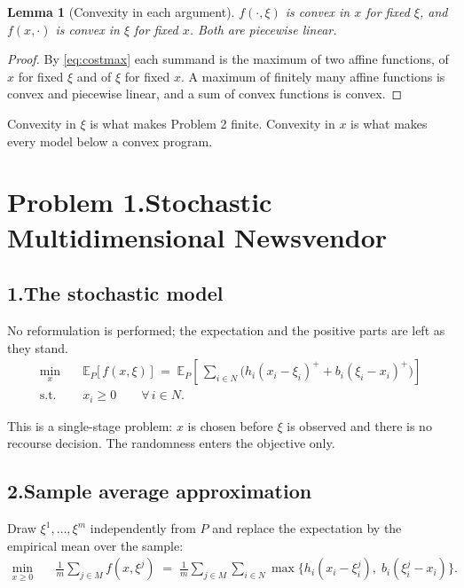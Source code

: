 \documentclass[11pt]{article}
\DeclareMathOperator*{\minimize}{min}
\newtheorem{lemma}{Lemma}
\theoremstyle{definition}
\begin{document}
\begin{lemma}[Convexity in each argument]
\label{lem:convex}
$f(\cdot,\xi)$ is convex in $x$ for fixed $\xi$, and $f(x,\cdot)$ is
convex in $\xi$ for fixed $x$. Both are piecewise linear.
\end{lemma}

\begin{proof}
By \eqref{eq:costmax} each summand is the maximum of two affine
functions, of $x$ for fixed $\xi$ and of $\xi$ for fixed $x$. A maximum
of finitely many affine functions is convex and piecewise linear, and a
sum of convex functions is convex.
\end{proof}

Convexity in $\xi$ is what makes Problem 2 finite. Convexity in $x$ is
what makes every model below a convex program.

\newpage
\section*{Problem 1.\quad Stochastic Multidimensional Newsvendor
  \quad[25 pts]}

\subsection*{1.\quad The stochastic model}

No reformulation is performed; the expectation and the positive parts are
left as they stand.
\begin{align}
  \minimize_{x} \quad & \mathbb{E}_{P}\big[\, f(x,\xi) \,\big]
    \;=\; \mathbb{E}_{P}\!\left[\, \sum_{i \in N}
      \Big( h_i (x_i - \xi_i)^{+} + b_i (\xi_i - x_i)^{+} \Big) \right] \\
  \text{s.t.}\quad & x_i \ge 0 \qquad \forall\, i \in N .
\end{align}

This is a single-stage problem: $x$ is chosen before $\xi$ is observed and
there is no recourse decision. The randomness enters the objective only.

\subsection*{2.\quad Sample average approximation}

Draw $\xi^1,\dots,\xi^m$ independently from $P$ and replace the
expectation by the empirical mean over the sample:
\begin{align}
  \minimize_{x \ge 0} \quad
    & \frac{1}{m} \sum_{j \in M} f(x,\xi^{j})
    \;=\; \frac{1}{m} \sum_{j \in M} \sum_{i \in N}
      \max\big\{ h_i (x_i - \xi^{j}_i),\; b_i(\xi^{j}_i - x_i) \big\}.
\end{align}
\end{document}
